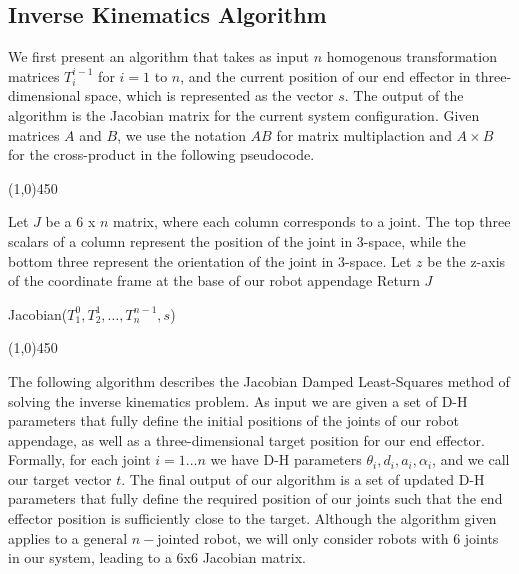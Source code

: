 \subsection{Inverse Kinematics Algorithm}
We first present an algorithm that takes as input $n$ homogenous transformation matrices $T^{i-1}_i$ for $i=1$ to $n$, and
the current position of our end effector in three-dimensional space, which is represented as the vector $s$. 
The output of the algorithm is the Jacobian matrix for the current system configuration. Given matrices $A$ and $B$, we use the notation
$AB$ for matrix multiplaction and $A \times B$ for the cross-product in the following pseudocode.\\

\begin{center}
\line(1,0){450}
\end{center}
\begin{algorithm}[H]
\DontPrintSemicolon
Let $J$ be a 6 x $n$ matrix, where each column corresponds to a joint. The top three scalars of a column represent the
position of the joint in 3-space, while the bottom three represent the orientation of the joint in 3-space.\;
Let $z$ be the z-axis of the coordinate frame at the base of our robot appendage\;
Return $J$
\caption{Jacobian($T^0_1, T^1_2, \ldots, T^{n-1}_n, s$)\label{IR}}
\begin{center}
\noindent\line(1,0){450}
\end{center}
\end{algorithm}
\vspace{2mm}

The following algorithm describes the Jacobian Damped Least-Squares method of solving the inverse kinematics problem. 
As input we are given a set of D-H parameters that fully define
the initial positions of the joints of our robot appendage, as well as a three-dimensional target position for our end effector. 
Formally, for each joint $i = 1 \ldots n$ we have D-H parameters $\theta_i, d_i, a_i, \alpha_i$, and
we call our target vector $t$. The final output of our algorithm is a set of updated D-H parameters that fully define
the required position of our joints such that the end effector position is sufficiently close to the target.
Although the algorithm given applies to a general $n-$jointed robot, we will only consider robots with 6 joints in our system, leading
to a 6x6 Jacobian matrix.


